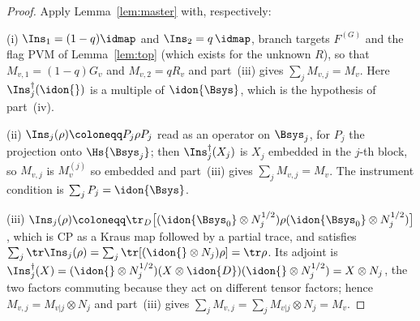 \begin{proof}
Apply Lemma~\ref{lem:master} with, respectively:

(i) $\Ins_1=(1-q)\idmap$ and $\Ins_2=q\,\idmap$, branch targets $F^{(G)}$ and
the flag PVM of Lemma~\ref{lem:top} (which exists for the unknown $R$), so that
$M_{v,1}=(1-q)G_v$ and $M_{v,2}=qR_v$ and part~(iii) gives
$\sum_jM_{v,j}=M_v$. Here $\Ins_j^{\dagger}(\idon{})$ is a multiple of
$\idon{\Bsys}$, which is the hypothesis of part~(iv).

(ii) $\Ins_j(\rho)\coloneqq P_j\rho P_j$ read as an operator on $\Bsys_j$, for
$P_j$ the projection onto $\Hs{\Bsys_j}$; then $\Ins_j^{\dagger}(X_j)$ is
$X_j$ embedded in the $j$-th block, so $M_{v,j}$ is $M^{(j)}_v$ so embedded and
part~(iii) gives $\sum_jM_{v,j}=M_v$. The instrument condition is
$\sum_jP_j=\idon{\Bsys}$.

(iii) $\Ins_j(\rho)\coloneqq
\tr_{D}\big[(\idon{\Bsys_0}\otimes N_j^{1/2})\rho(\idon{\Bsys_0}\otimes
N_j^{1/2})\big]$, which is CP as a Kraus map followed by a partial trace, and
satisfies $\sum_j\tr\Ins_j(\rho)=\sum_j\tr[(\idon{}\otimes N_j)\rho]=\tr\rho$.
Its adjoint is
$\Ins_j^{\dagger}(X)=(\idon{}\otimes N_j^{1/2})(X\otimes\idon{D})
(\idon{}\otimes N_j^{1/2})=X\otimes N_j$, the two factors commuting because
they act on different tensor factors; hence
$M_{v,j}=M_{v|j}\otimes N_j$ and part~(iii) gives
$\sum_jM_{v,j}=\sum_jM_{v|j}\otimes N_j=M_v$.
\end{proof}
